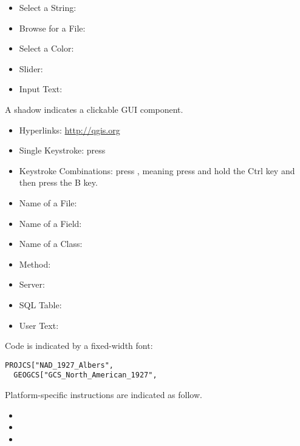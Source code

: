 \begin{itemize}
%
\item Select a String: 
%
%
\item Browse for a File: \browsebutton 
%
\item Select a Color: 
%
\item Slider: 
%
\item Input Text: 
\end{itemize}
A shadow indicates a clickable GUI component.

\begin{itemize}
%
\item Hyperlinks: \url{http://qgis.org}
%
\item Single Keystroke: press 
\item Keystroke Combinations: press , meaning press and
hold the Ctrl key and then press the B key.
\item Name of a File: 
\item Name of a Field: 
\item Name of a Class: 
\item Method: 
\item Server: 
\item SQL Table:     
%
\item User Text: 
\end{itemize}

Code is indicated by a fixed-width font:
\begin{verbatim}
PROJCS["NAD_1927_Albers",
  GEOGCS["GCS_North_American_1927",
\end{verbatim}

Platform-specific instructions are indicated as follow.
\begin{itemize}
\item {} 
\item {} 
\item {}
\end{itemize} 





